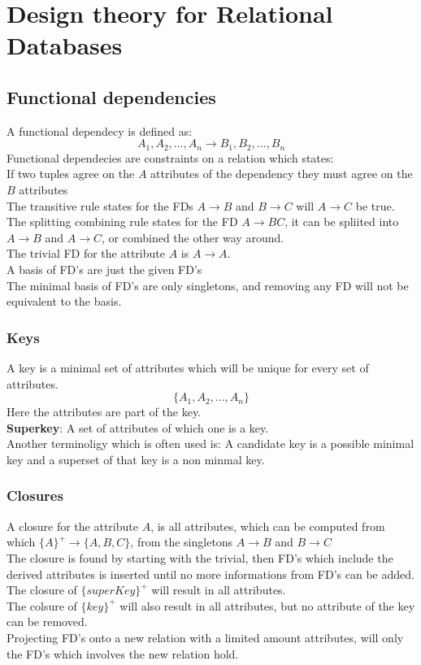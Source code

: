 \documentclass[12pt, a4paper]{article}
\begin{document}
		
	\section{Design theory for Relational Databases}
		\subsection{Functional dependencies}
			A functional dependecy is defined as:
			$$A_1,A_2,...,A_n \rightarrow B_1,B_2,...,B_n$$
			Functional dependecies are constraints on a relation which states: \\
			If two tuples agree on the $A$ attributes of the dependency they must agree on the $B$ attributes\\
			The transitive rule states for the FDs $A\rightarrow B$ and $B\rightarrow C$ will $A\rightarrow C$ be true.\\
			The splitting combining rule states for the FD $A\rightarrow BC$, it can be spliited into $A\rightarrow B$ and $A\rightarrow C$, or combined the other way around.\\
			The trivial FD for the attribute $A$ is $A\rightarrow A$.\\
			A basis of FD's are just the given FD's\\
			The minimal basis of FD's are only singletons, and removing any FD will not be equivalent to the basis.\\ 
		\subsubsection{Keys}
			A key is a minimal set of attributes which will be unique for every set of attributes.\\
			$$\{A_1,A_2,...,A_n\}$$
			Here the attributes are part of the key.\\
			\textbf{Superkey}: A set of attributes of which one is a key.\\
			Another terminoligy which is often used is: A candidate key is a possible minimal key and a superset of that key is a non minmal key.
		\subsubsection{Closures}
				  A closure for the attribute $A$, is all attributes, which can be computed from which $\{A\}^+\rightarrow \{A,B,C\}$, from the singletons $A\rightarrow B$ and $B\rightarrow C$\\
				  The closure is found by starting with the trivial, then FD's which include the derived attributes is inserted until no more informations from FD's can be added.\\
				  The closure of $\{superKey\}^+$ will result in all attributes.\\
				  The colsure of $\{key\}^+$ will also result in all attributes, but no attribute of the key can be removed.\\
				  Projecting FD's onto a new relation with a limited amount attributes, will only the FD's which involves the new relation hold.
\end{document}
